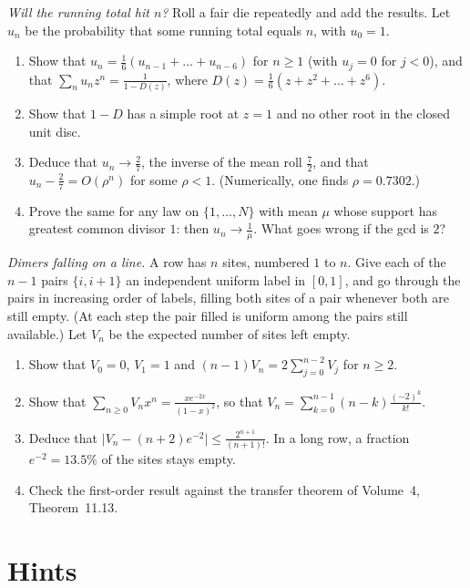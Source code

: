 \begin{exercise}[$\star\star$]\label{pb:diehit}
\emph{Will the running total hit $n$?} Roll a fair die repeatedly and add the results. Let $u_n$ be the probability that some running total equals $n$, with $u_0=1$.
\begin{enumerate}[label=(\alph*)]
\item Show that $u_n=\frac16(u_{n-1}+\dots+u_{n-6})$ for $n\ge1$ (with $u_j=0$ for $j<0$), and that $\sum_nu_nz^n=\frac1{1-D(z)}$, where $D(z)=\frac16(z+z^2+\dots+z^6)$.
\item Show that $1-D$ has a simple root at $z=1$ and no other root in the closed unit disc.
\item Deduce that $u_n\to\frac27$, the inverse of the mean roll $\frac72$, and that $u_n-\frac27=O(\rho^n)$ for some $\rho<1$. (Numerically, one finds $\rho=0.7302$.)
\item Prove the same for any law on $\{1,\dots,N\}$ with mean $\mu$ whose support has greatest common divisor $1$: then $u_n\to\frac1\mu$. What goes wrong if the gcd is $2$?
\end{enumerate}
\end{exercise}

\begin{exercise}[$\star\star$]\label{pb:flory}
\emph{Dimers falling on a line.} A row has $n$ sites, numbered $1$ to $n$. Give each of the $n-1$ pairs $\{i,i+1\}$ an independent uniform label in $[0,1]$, and go
through the pairs in increasing order of labels, filling both sites of a pair whenever both are still empty. (At each step the pair filled is
uniform among the pairs still available.) Let $V_n$ be the expected number of sites left empty.
\begin{enumerate}[label=(\alph*)]
\item Show that $V_0=0$, $V_1=1$ and $(n-1)V_n=2\sum_{j=0}^{n-2}V_j$ for $n\ge2$.
\item Show that $\sum_{n\ge0}V_nx^n=\frac{xe^{-2x}}{(1-x)^2}$, so that $V_n=\sum_{k=0}^{n-1}(n-k)\frac{(-2)^k}{k!}$.
\item Deduce that $\bigl|V_n-(n+2)e^{-2}\bigr|\le\frac{2^{n+1}}{(n+1)!}$. In a long row, a fraction $e^{-2}=13.5\%$ of the sites stays empty.
\item Check the first-order result against the transfer theorem of Volume~4, Theorem~11.13.
\end{enumerate}
\end{exercise}

\section{Hints}

